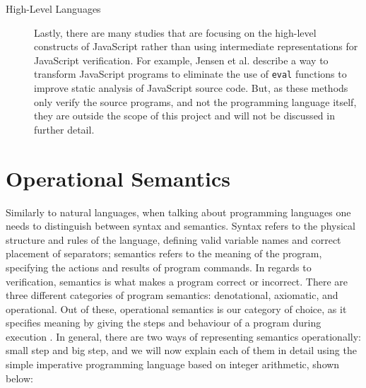 \documentclass[a4paper,11pt,twoside]{report}
\begin{document}
\begin{description}

%

\item[High-Level Languages] Lastly, there are many studies that are focusing on the high-level constructs of JavaScript rather than using intermediate representations for JavaScript verification. For example, Jensen et al. \cite{unevalizer2012} describe a way to transform JavaScript programs to eliminate the use of \texttt{eval} functions to improve static analysis of JavaScript source code. But, as these methods only verify the source programs, and not the programming language itself, they are outside the scope of this project and will not be discussed in further detail.
\end{description}

\section{Operational Semantics}\label{sec:opsem}
Similarly to natural languages, when talking about programming languages one needs to distinguish between syntax and semantics. Syntax refers to the physical structure and rules of the language, defining valid variable names and correct placement of separators; semantics refers to the meaning of the program, specifying the actions and results of program commands. In regards to verification, semantics is what makes a program correct or incorrect. There are three different categories of program semantics: denotational, axiomatic, and operational. Out of these, operational semantics is our category of choice, as it specifies meaning by giving the steps and behaviour of a program during execution \cite{PittsAM:opespe}. In general, there are two ways of representing semantics operationally: small step and big step, and we will now explain each of them in detail using the simple imperative programming language based on integer arithmetic, shown below:
\end{document}
